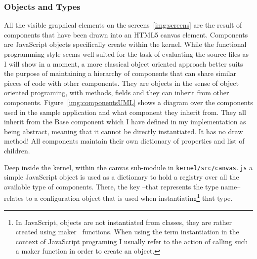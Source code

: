 \subsubsection{Objects and Types}

All the visible graphical elements on the screens~\ref{img:screens} are the result of components that have been drawn into an HTML5 canvas element. Components are JavaScript objects specifically create within the kernel. While the functional programming style seems well suited for the task of evaluating the source files as I will show in a moment, a more classical object oriented approach better suits the purpose of maintaining a hierarchy of components that can share similar pieces of code with other components. They are objects in the sense of object oriented programing, with methods, fields and they can inherit from other components. Figure~\ref{img:componentsUML} shows a diagram over the components used in the sample application and what component they inherit from. They all inherit from the Base component which I have defined in my implementation as being abstract, meaning that it cannot be directly instantiated. It has no draw method! All components maintain their own dictionary of properties and list of children. 

Deep inside the kernel, within the canvas sub-module in \texttt{kernel/src/canvas.js} a simple JavaScript object is used as a dictionary to hold a registry over all the available type of components. There, the key --that represents the type name-- relates to a configuration object that is used when instantiating\footnote{In JavaScript, objects are not instantiated from classes, they are rather created using maker~\cite{crockford_inheritance} functions. When using the term instantiation in the context of JavaScript programing I usually refer to the action of calling such a maker function in order to create an object.} that type.

